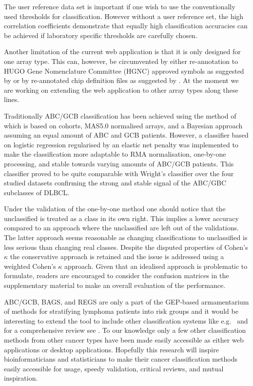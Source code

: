 \documentclass{article}
\begin{document}
The user reference data set is important if one wish to use the conventionally used thresholds for classification.
However without a user reference set, the high correlation coefficients demonstrate that equally high classification accuracies can be achieved if laboratory specific thresholds are carefully chosen.

Another limitation of the current web application is that it is only designed for one array type.
This can, however, be circumvented by either re-annotation to HUGO Gene Nomenclature Committee (HGNC) approved symbols as suggested by \citet{Care2013} or by re-annotated chip definition files as suggested by \citep{Dai2005}.
At the moment we are working on extending the web application to other array types along these lines.

Traditionally ABC/GCB classification has been achieved using the method of \citet{Wright2003} which is based on cohorts, MAS5.0 normalised arrays, and a Bayesian approach assuming an equal amount of ABC and GCB patients.
However, a classifier based on logistic regression regularised by an elastic net penalty was implemented to make the classification more adaptable to RMA normalisation, one-by-one processing, and stable towards varying amounts of ABC/GCB patients.
This classifier proved to be quite comparable with Wright's classifier over the four studied datasets confirming the strong and stable signal of the ABC/GBC subclasses of DLBCL.

Under the validation of the one-by-one method one should notice that the unclassified is treated as a class in its own right.
This implies a lower accuracy compared to an approach where the unclassified are left out of the validations.
The latter approach seems reasonable as changing classifications to unclassified is less serious than changing real classes.
Despite the disputed properties of Cohen's $\kappa$ the conservative approach is retained and the issue is addressed using a weighted Cohen's $\kappa$ approach.
Given that an idealised approach is problematic to formulate, readers are encouraged to consider the confusion matrices in the supplementary material to make an overall evaluation of the performance.

ABC/GCB, BAGS, and REGS are only a part of the GEP-based armamentarium of methods for stratifying lymphoma patients into risk groups and it would be interesting to extend the tool to include other classification systems like e.g.\ \citep{Shipp2002, Lossos2004a, Malumbres2008} and for a comprehensive review see \citep{Coutinho2013}.
To our knowledge only a few other classification methods from other cancer types have been made easily accessible as either web applications or desktop applications.
Hopefully this research will inspire bioinformaticians and statisticians to make their cancer classification methods easily accessible for usage, speedy validation, critical reviews, and mutual inspiration.
\end{document}
